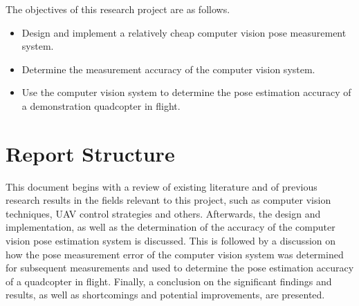 The objectives of this research project are as follows. 

\begin{itemize}
  \item Design and implement a relatively cheap computer vision pose measurement system.
  \item Determine the measurement accuracy of the computer vision system.
  \item Use the computer vision system to determine the pose estimation accuracy of a demonstration quadcopter in flight. 
\end{itemize}

\section{Report Structure}

This document begins with a review of existing literature and of previous research results in the fields relevant to this project, such as computer vision techniques, UAV control strategies and others. Afterwards, the design and implementation, as well as the determination of the accuracy of the computer vision pose estimation system is discussed. This is followed by a discussion on how the pose measurement error of the computer vision system was determined for subsequent measurements and used to determine the pose estimation accuracy of a quadcopter in flight. Finally, a conclusion on the significant findings and results, as well as shortcomings and potential improvements, are presented. 
